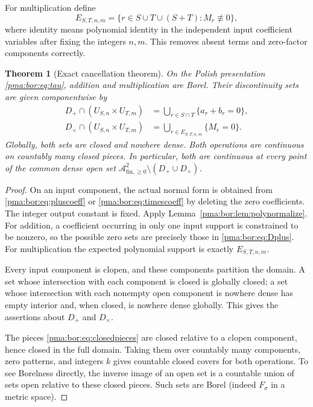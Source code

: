 \documentclass[11pt]{article}
\numberwithin{equation}{section}
\newtheorem{theorem}{Theorem}[section]
\theoremstyle{definition}
\theoremstyle{remark}
\newcommand{\PP}{\mathcal A_{\mathrm{fin},\geq 0}}
\begin{document}
For multiplication define
\[
 E_{S,T,n,m}=\{r\in S\cup T\cup(S+T):M_r\not\equiv0\},
\]
where identity means polynomial identity in the independent input coefficient
variables after fixing the integers $n,m$. This removes absent terms and
zero-factor components correctly.

\begin{theorem}[Exact cancellation theorem]
\label{pma:bor:thm:cancellation}
On the Polish presentation \eqref{pma:bor:eq:tau}, addition and multiplication are
Borel. Their discontinuity sets are given componentwise by
\begin{align}
 D_+\cap(U_{S,n}\times U_{T,m})
   &=\bigcup_{r\in S\cap T}\{a_r+b_r=0\},\label{pma:bor:eq:Dplus}\\
 D_\times\cap(U_{S,n}\times U_{T,m})
   &=\bigcup_{r\in E_{S,T,n,m}}\{M_r=0\}.
   \label{pma:bor:eq:Dtimes}
\end{align}
Globally, both sets are closed and nowhere dense. Both operations are
continuous on countably many closed pieces. In particular, both are
continuous at every point of the common dense open set
$\PP^2\setminus(D_+\cup D_\times)$.
\end{theorem}
\begin{proof}
On an input component, the actual normal form is obtained from
\eqref{pma:bor:eq:pluscoeff} or \eqref{pma:bor:eq:timescoeff} by deleting the zero
coefficients. The integer output constant is fixed. Apply
Lemma~\ref{pma:bor:lem:polynormalize}. For addition, a coefficient occurring in only
one input support is constrained to be nonzero, so the possible zero sets
are precisely those in \eqref{pma:bor:eq:Dplus}. For multiplication the expected
polynomial support is exactly $E_{S,T,n,m}$.

Every input component is clopen, and these components partition the domain.
A set whose intersection with each component is closed is globally closed;
a set whose intersection with each nonempty open component is nowhere dense
has empty interior and, when closed, is nowhere dense globally. This gives the
assertions about $D_+$ and $D_\times$.

The pieces \eqref{pma:bor:eq:closedpieces} are closed relative to a clopen component,
hence closed in the full domain. Taking them over countably many components,
zero patterns, and integers $k$ gives countable closed covers for both
operations. To see Borelness directly, the inverse image of an open set is a
countable union of sets open relative to these closed pieces. Such sets are
Borel (indeed $F_\sigma$ in a metric space).
\end{proof}
\end{document}
